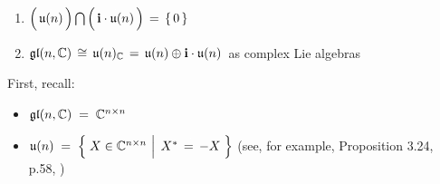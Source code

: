 \begin{lemma}\label{glnCunC}
\mbox{}
\vskip 0.05cm
\noindent
\begin{enumerate}
\item
    $
    \left(\,\overset{{\color{white}.}}{\mathfrak{u}(n)}\,\right)
    \bigcap
    \left(\,\overset{{\color{white}.}}{\i\cdot\mathfrak{u}(n)}\,\right)
    \, = \,
    \{\,0\,\}
    $\,
\item
    $\mathfrak{gl}(n,\mathbb{C}) \,\cong\, \mathfrak{u}(n)_{\mathbb{C}} \,=\, \mathfrak{u}(n) \oplus \mathbf{i}\cdot\mathfrak{u}(n)$\,
    as complex Lie algebras
\end{enumerate}
\end{lemma}
\proof
\vskip 0.1cm
\noindent
First, recall:
\begin{itemize}
\item
    $\mathfrak{gl}(n,\mathbb{C}) \; = \; \mathbb{C}^{n \times n}$
\item
    $
    \mathfrak{u}(n)
    \; = \;
        \left\{\;
            X \in \C^{n \times n}
            \,\left\vert\;\,
            \overset{{\color{white}.}}{X^{*} \,=\, -X}
            \right.
            \,\right\}
    $
    \quad
    (see, for example, Proposition 3.24, p.58, \cite{Hall2015})
\end{itemize}
